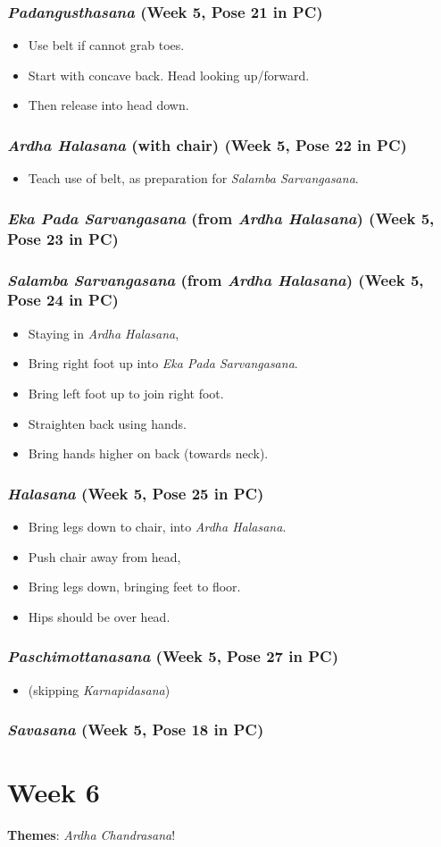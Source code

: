 \documentclass{book}
\newcommand{\apose}[1]{\emph{#1}}
\newcommand{\ardhal}{\apose{Ardha Halasana}}
\newcommand{\ardchand}{\apose{Ardha Chandrasana}}
\newcommand{\ekapadsarv}{\apose{Eka Pada Sarvangasana}}
\newcommand{\hal}{\apose{Halasana}}
\newcommand{\karn}{\apose{Karnapidasana}}
\newcommand{\padang}{\apose{Padangusthasana}}
\newcommand{\paschi}{\apose{Paschimottanasana}}
\newcommand{\sarv}{\apose{Salamba Sarvangasana}}
\newcommand{\sav}{\apose{Savasana}}
\newcommand{\PC}[2]{{\normalfont \hfill(Week #1, Pose #2 in PC)}}
\newcommand{\newpose}[1]{{{#1}}}
\newcounter{week}
\newcounter{pose}
\newcommand{\week}[1]
{ \IfDecimal{#1}{\setcounter{week}{\integerpart}}{fooey}
  \setcounter{pose}{1}
  \chapter{Week {#1}}}
\newcommand{\pose}{\subsection}
\begin{document}
\pose{ \newpose{\padang{}}  \PC{5}{21}}

  \begin{itemize}
  \item Use belt if cannot grab toes.
  \item Start with concave back. Head looking up/forward.
  \item Then release into head down.
  \end{itemize}

\pose{ \ardhal{} (with chair)  \PC{5}{22}}

  \begin{itemize}
  \item Teach use of belt, as preparation for \sarv{}.
  \end{itemize}

\pose{ \newpose{\ekapadsarv{}} (from \ardhal{})  \PC{5}{23}}

\pose{ \newpose{\sarv{}} (from \ardhal{})  \PC{5}{24}}

  \begin{itemize}
  \item Staying in \ardhal{},
  \item Bring right foot up into \ekapadsarv{}.
  \item Bring left foot up to join right foot.
  \item Straighten back using hands.
  \item Bring hands higher on back (towards neck).
  \end{itemize}

\pose{ \newpose{\hal{}}  \PC{5}{25}}

  \begin{itemize}
  \item Bring legs down to chair, into \ardhal{}.
  \item Push chair away from head,
  \item Bring legs down, bringing feet to floor.
  \item Hips should be over head.
  \end{itemize}

\pose{ \paschi{}  \PC{5}{27}}

  \begin{itemize}
  \item (skipping \karn{})
  \end{itemize}

\pose{ \sav{}  \PC{5}{18}}


\week{6}
\label{week:6}

\textbf{Themes}: \ardchand{}!
\end{document}
